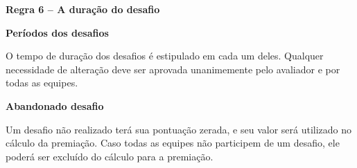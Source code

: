 \clearpage
\sffamily
{\bfseries\color[rgb]{0.4,0.4,0.4}
Regra 6 – A duração do desafio}
{}

\bigskip

{\bfseries Períodos dos desafios}

\headlinebox

O tempo de duração dos desafios é estipulado em cada um deles. Qualquer necessidade de alteração deve ser aprovada unanimemente pelo avaliador e por todas as equipes.


\bigskip

{\sffamily
\textbf{Abandonado desafio}}

\headlinebox

Um desafio não realizado terá sua pontuação zerada, e seu valor será utilizado no cálculo da premiação. Caso todas as equipes não participem de um desafio, ele poderá ser excluído do cálculo para a premiação.